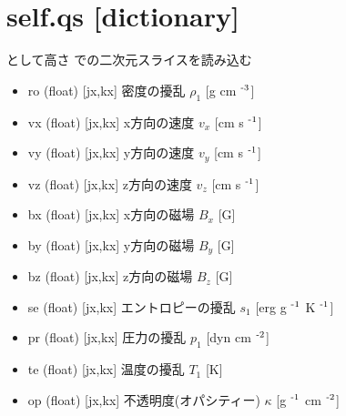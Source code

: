 \documentclass[letterpaper,10pt,dvipdfmx,report]{sphinxmanual}
\begin{document}
\section{self.qs {[}dictionary{]}}
\label{\detokenize{notation:self-qs-dictionary}}
\begin{sphinxVerbatim}[commandchars=\\\{\}]
  
  
\end{sphinxVerbatim}

として高さ  での二次元スライスを読み込む
\begin{itemize}
\item {} 
ro (float) {[}jx,kx{]} \sphinxhyphen{}\sphinxhyphen{} 密度の擾乱 \(\rho_1\) {[}g cm $^{\text{\sphinxhyphen{}3}}${]}

\item {} 
vx (float) {[}jx,kx{]} \sphinxhyphen{}\sphinxhyphen{} x方向の速度 \(v_x\) {[}cm s $^{\text{\sphinxhyphen{}1}}${]}

\item {} 
vy (float) {[}jx,kx{]} \sphinxhyphen{}\sphinxhyphen{} y方向の速度 \(v_y\) {[}cm s $^{\text{\sphinxhyphen{}1}}${]}

\item {} 
vz (float) {[}jx,kx{]} \sphinxhyphen{}\sphinxhyphen{} z方向の速度 \(v_z\) {[}cm s $^{\text{\sphinxhyphen{}1}}${]}

\item {} 
bx (float) {[}jx,kx{]} \sphinxhyphen{}\sphinxhyphen{} x方向の磁場 \(B_x\) {[}G{]}

\item {} 
by (float) {[}jx,kx{]} \sphinxhyphen{}\sphinxhyphen{} y方向の磁場 \(B_y\) {[}G{]}

\item {} 
bz (float) {[}jx,kx{]} \sphinxhyphen{}\sphinxhyphen{} z方向の磁場 \(B_z\) {[}G{]}

\item {} 
se (float) {[}jx,kx{]} \sphinxhyphen{}\sphinxhyphen{} エントロピーの擾乱 \(s_1\) {[}erg g $^{\text{\sphinxhyphen{}1}}$ K $^{\text{\sphinxhyphen{}1}}${]}

\item {} 
pr (float) {[}jx,kx{]} \sphinxhyphen{}\sphinxhyphen{} 圧力の擾乱 \(p_1\) {[}dyn cm $^{\text{\sphinxhyphen{}2}}${]}

\item {} 
te (float) {[}jx,kx{]} \sphinxhyphen{}\sphinxhyphen{} 温度の擾乱 \(T_1\) {[}K{]}

\item {} 
op (float) {[}jx,kx{]} \sphinxhyphen{}\sphinxhyphen{} 不透明度(オパシティー) \(\kappa\) {[}g $^{\text{\sphinxhyphen{}1}}$ cm $^{\text{\sphinxhyphen{}2}}${]}

\end{itemize}
\end{document}
